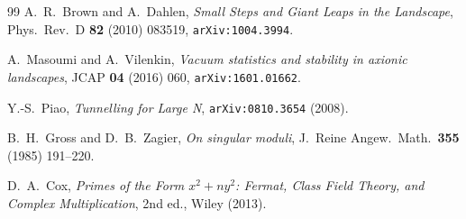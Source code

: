 \documentclass[11pt,a4paper]{article}
\theoremstyle{plain}
\theoremstyle{definition}
\newcommand{\PRD}{Phys.\ Rev.\ D}
\begin{document}
\begin{thebibliography}{99}
A.~R.~Brown and A.~Dahlen,
\emph{Small Steps and Giant Leaps in the Landscape},
\PRD{} \textbf{82} (2010) 083519,
\texttt{arXiv:1004.3994}.

A.~Masoumi and A.~Vilenkin,
\emph{Vacuum statistics and stability in axionic landscapes},
JCAP \textbf{04} (2016) 060,
\texttt{arXiv:1601.01662}.

Y.-S.~Piao,
\emph{Tunnelling for Large N},
\texttt{arXiv:0810.3654} (2008).

B.~H.~Gross and D.~B.~Zagier,
\emph{On singular moduli},
J.\ Reine Angew.\ Math.\ \textbf{355} (1985) 191--220.

D.~A.~Cox,
\emph{Primes of the Form $x^2+ny^2$: Fermat, Class Field Theory, and Complex Multiplication},
2nd ed., Wiley (2013).

\end{thebibliography}
\end{document}
